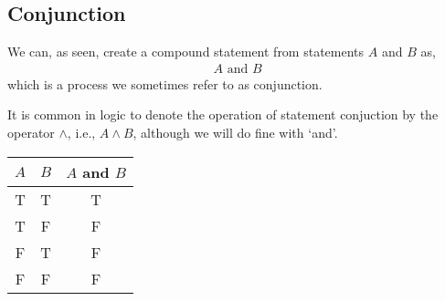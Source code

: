\subsection{Conjunction}
We can, as seen, create a compound statement from statements $ A $ and $ B $ as,
\begin{align*}
	A \text{ and } B
\end{align*}
which is a process we sometimes refer to as conjunction.

\begin{notation}
	It is common in logic to denote the operation of statement conjuction by the operator $ \land $, i.e., $ A \land B $, although we will do fine with `and'.
\end{notation}

\begin{center}
	\begin{tabular}{|c|c|c|}
		\hline
		$ A $ & $ B $ & $ A $ and $ B $ \\
		\hline
		T     & T     & T               \\
		T     & F     & F               \\
		F     & T     & F               \\
		F     & F     & F               \\
		\hline
	\end{tabular}
\end{center}



